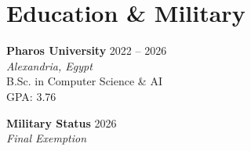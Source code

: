 \section{Education \& Military}    
\resumeSubHeadingListStart

    \item
    \begin{minipage}[t]{\linewidth}
      \textbf{Pharos University} \hfill {\footnotesize 2022 -- 2026} \\
      \textit{\footnotesize Alexandria, Egypt} \\[1pt]
      \footnotesize{B.Sc. in Computer Science \& AI} \\
      \footnotesize{GPA: 3.76}
    \end{minipage}\vspace{-2pt}

    \item
    \begin{minipage}[t]{\linewidth}
      \textbf{Military Status} \hfill {\footnotesize 2026} \\
      \textit{\footnotesize Final Exemption}
    \end{minipage}\vspace{-4pt}

\resumeSubHeadingListEnd